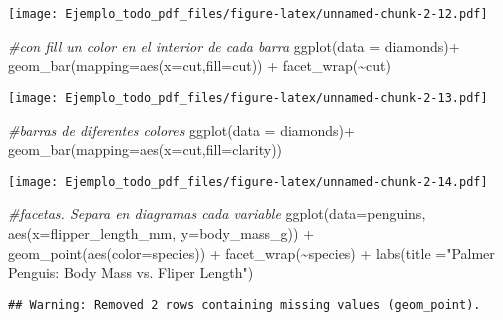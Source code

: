 \documentclass[
]{article}
\newenvironment{Shaded}{\begin{snugshade}}{\end{snugshade}}
\newcommand{\AttributeTok}[1]{\textcolor[rgb]{0.77,0.63,0.00}{#1}}
\newcommand{\CommentTok}[1]{\textcolor[rgb]{0.56,0.35,0.01}{\textit{#1}}}
\newcommand{\FunctionTok}[1]{\textcolor[rgb]{0.00,0.00,0.00}{#1}}
\newcommand{\NormalTok}[1]{#1}
\newcommand{\SpecialCharTok}[1]{\textcolor[rgb]{0.00,0.00,0.00}{#1}}
\newcommand{\StringTok}[1]{\textcolor[rgb]{0.31,0.60,0.02}{#1}}
\begin{document}
\texttt{[image: Ejemplo\_todo\_pdf\_files/figure-latex/unnamed-chunk-2-12.pdf]}

\begin{Shaded}
\begin{Highlighting}[]
\CommentTok{\#con fill un color en el interior de cada barra}
\FunctionTok{ggplot}\NormalTok{(}\AttributeTok{data =}\NormalTok{ diamonds)}\SpecialCharTok{+}
  \FunctionTok{geom\_bar}\NormalTok{(}\AttributeTok{mapping=}\FunctionTok{aes}\NormalTok{(}\AttributeTok{x=}\NormalTok{cut,}\AttributeTok{fill=}\NormalTok{cut)) }\SpecialCharTok{+} \FunctionTok{facet\_wrap}\NormalTok{(}\SpecialCharTok{\textasciitilde{}}\NormalTok{cut) }
\end{Highlighting}
\end{Shaded}

\texttt{[image: Ejemplo\_todo\_pdf\_files/figure-latex/unnamed-chunk-2-13.pdf]}

\begin{Shaded}
\begin{Highlighting}[]
\CommentTok{\#barras de diferentes colores}
\FunctionTok{ggplot}\NormalTok{(}\AttributeTok{data =}\NormalTok{ diamonds)}\SpecialCharTok{+}
  \FunctionTok{geom\_bar}\NormalTok{(}\AttributeTok{mapping=}\FunctionTok{aes}\NormalTok{(}\AttributeTok{x=}\NormalTok{cut,}\AttributeTok{fill=}\NormalTok{clarity))}
\end{Highlighting}
\end{Shaded}

\texttt{[image: Ejemplo\_todo\_pdf\_files/figure-latex/unnamed-chunk-2-14.pdf]}

\begin{Shaded}
\begin{Highlighting}[]
\CommentTok{\#facetas. Separa en diagramas cada variable}
\FunctionTok{ggplot}\NormalTok{(}\AttributeTok{data=}\NormalTok{penguins, }\FunctionTok{aes}\NormalTok{(}\AttributeTok{x=}\NormalTok{flipper\_length\_mm, }\AttributeTok{y=}\NormalTok{body\_mass\_g)) }\SpecialCharTok{+}
         \FunctionTok{geom\_point}\NormalTok{(}\FunctionTok{aes}\NormalTok{(}\AttributeTok{color=}\NormalTok{species)) }\SpecialCharTok{+} \FunctionTok{facet\_wrap}\NormalTok{(}\SpecialCharTok{\textasciitilde{}}\NormalTok{species) }\SpecialCharTok{+}
  \FunctionTok{labs}\NormalTok{(}\AttributeTok{title =}\StringTok{"Palmer Penguis: Body Mass vs. Fliper Length"}\NormalTok{)}
\end{Highlighting}
\end{Shaded}

\begin{verbatim}
## Warning: Removed 2 rows containing missing values (geom_point).
\end{verbatim}
\end{document}

